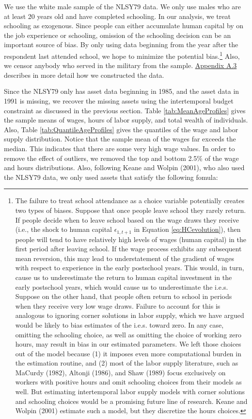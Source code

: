 \documentclass{article}
\begin{document}
 We use the white male sample of the NLSY79 data. We only use males who are at least 20 years old and have completed schooling. In our analysis, we treat schooling as exogenous. Since people can either accumulate human capital by on the job experience or schooling, omission of the schooling decision can be an important source of bias. By only using data beginning from the year after the respondent last attended school, we hope to minimize the potential bias.\footnote[9]{The failure to treat school attendance as a choice variable potentially creates two types of biases. Suppose that once people leave school they rarely return. If people decide when to leave school based on the wage draws they receive (i.e., the shock to human capital $\epsilon_{1,t+1}$ in Equation \eqref{eq:HCevolution}), then people will tend to have relatively high levels of wages (human capital) in the first period after leaving school. If the wage process exhibits any subsequent mean reversion, this may lead to understatement of the gradient of wages with respect to experience in the early postschool years. This would, in turn, cause us to underestimate the return to human capital investment in the early postschool years, which would cause us to underestimate the i.e.s. Suppose on the other hand, that people often return to school in periods when they receive very low wage draws. Failure to account for this is analogous to ignoring corner solutions in labor supply, which we have argued would be likely to bias estimates of the i.e.s. toward zero. In any case, omitting the schooling choice, as well as omitting the choice of working zero hours, may result in bias in our estimated parameters. We left those choices out of the model because (1) it imposes even more computational burden in the estimation routine, and (2) most of the labor supply literature, such as MaCurdy (1982), Altonji (1986), and Shaw (1989) focus exclusively on workers with positive hours and omit schooling choices from their models as well. But estimating intertemporal labor supply models with corner solutions and schooling choices would be a promising future line of research. Keane and Wolpin (2001) estimate such a model, but they discretize the hours choices.} Also, we censor anybody who served in the military from the sample. \hyperref[appendixA3]{Appendix A.3} describes in more detail how we constructed the data. \par
 
 Since the NLSY79 only has asset data beginning in 1985, and the asset data in 1991 is missing, we recover the missing assets using the intertemporal budget constraint as discussed in the previous section. Table \ref{tab:MeanAgeProfiles} gives the sample means of wages, hours of labor supply, and total wealth of individuals. Also, Table \ref{tab:QuantileAgeProfiles} gives the quantiles of the wage and labor supply distribution. Notice that the sample mean of the wages far exceeds the median. This indicates that there are some very high wage values. In order to remove the effect of outliers, we removed the top and bottom 2.5\% of the wage and hours distributions. Also, following Keane and Wolpin (2001), who also used the NLSY79 data, we only used assets that satisfy the following fomula:
\end{document}
